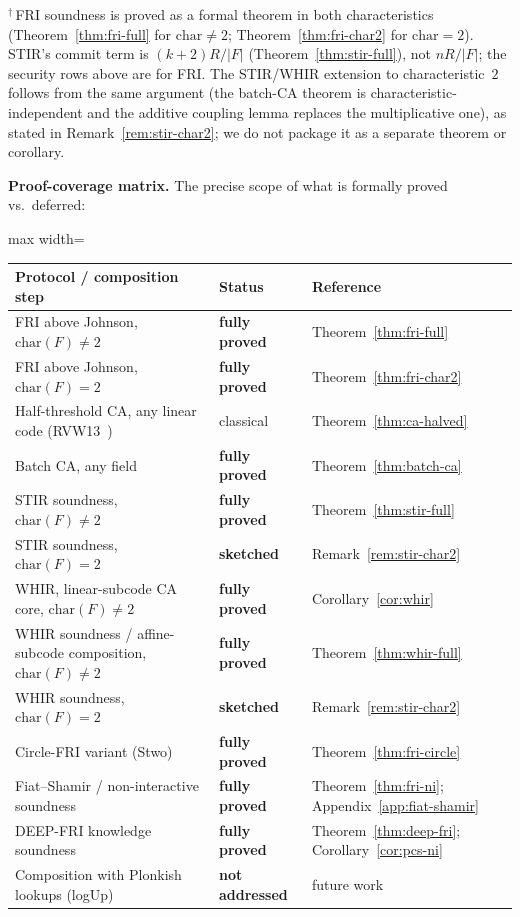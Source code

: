 \documentclass[11pt]{article}
\begin{document}
\noindent $^\dagger$\,FRI soundness is proved as a formal theorem in both characteristics (Theorem~\ref{thm:fri-full} for $\mathrm{char} \neq 2$; Theorem~\ref{thm:fri-char2} for $\mathrm{char} = 2$). STIR's commit term is $(k{+}2)R/|F|$ (Theorem~\ref{thm:stir-full}), not $nR/|F|$; the security rows above are for FRI. The STIR/WHIR extension to characteristic~$2$ follows from the same argument (the batch-CA theorem is characteristic-independent and the additive coupling lemma replaces the multiplicative one), as stated in Remark~\ref{rem:stir-char2}; we do not package it as a separate theorem or corollary.

\medskip
\noindent\textbf{Proof-coverage matrix.} The precise scope of what is formally proved vs.\ deferred:

\begin{center}
\begin{adjustbox}{max width=\textwidth}
\small
\begin{tabular}{lll}
\toprule
Protocol / composition step & Status & Reference \\
\midrule
FRI above Johnson, $\mathrm{char}(F) \neq 2$ & \textbf{fully proved} & Theorem~\ref{thm:fri-full} \\
FRI above Johnson, $\mathrm{char}(F) = 2$ & \textbf{fully proved} & Theorem~\ref{thm:fri-char2} \\
Half-threshold CA, any linear code (RVW13~\cite{RVW}) & classical & Theorem~\ref{thm:ca-halved} \\
Batch CA, any field & \textbf{fully proved} & Theorem~\ref{thm:batch-ca} \\
STIR soundness, $\mathrm{char}(F) \neq 2$ & \textbf{fully proved} & Theorem~\ref{thm:stir-full} \\
STIR soundness, $\mathrm{char}(F) = 2$ & \textbf{sketched} & Remark~\ref{rem:stir-char2} \\
WHIR, linear-subcode CA core, $\mathrm{char}(F) \neq 2$ & \textbf{fully proved} & Corollary~\ref{cor:whir} \\
WHIR soundness / affine-subcode composition, $\mathrm{char}(F) \neq 2$ & \textbf{fully proved} & Theorem~\ref{thm:whir-full} \\
WHIR soundness, $\mathrm{char}(F) = 2$ & \textbf{sketched} & Remark~\ref{rem:stir-char2} \\
Circle-FRI variant (Stwo) & \textbf{fully proved} & Theorem~\ref{thm:fri-circle} \\
Fiat--Shamir / non-interactive soundness & \textbf{fully proved} & Theorem~\ref{thm:fri-ni}; Appendix~\ref{app:fiat-shamir} \\
DEEP-FRI knowledge soundness & \textbf{fully proved} & Theorem~\ref{thm:deep-fri}; Corollary~\ref{cor:pcs-ni} \\
Composition with Plonkish lookups (logUp) & \textbf{not addressed} & future work \\
\bottomrule
\end{tabular}
\end{adjustbox}
\end{center}
\end{document}
